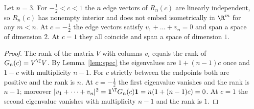 \begin{theorem}\label{thm:main}
Let $n=3$. For $- \frac{1}{2}<c<1$ the $n$ edge vectors of $R_n(c)$ are linearly independent, so $R_n(c)$ has nonempty interior and does not embed isometrically in $\R^m$ for any $m<n$.
At $c=- \frac{1}{2}$ the edge vectors satisfy $v_1+\dots+v_n=0$ and span a space of dimension $2$.
At $c=1$ they all coincide and span a space of dimension $1$.
\end{theorem}
\begin{proof}
The rank of the matrix $V$ with columns $v_i$ equals the rank of $G_n(c)=V^\T V$.
By Lemma~\ref{lem:spec} the eigenvalues are $1+(n-1)c$ once and $1-c$ with multiplicity $n-1$.
For $c$ strictly between the endpoints both are positive and the rank is $n$.
At $c=- \frac{1}{2}$ the first eigenvalue vanishes and the rank is $n-1$; moreover $|v_1+\dots+v_n|^2=\mathbf 1^\T G_n(c)\mathbf 1=n(1+(n-1)c)=0$.
At $c=1$ the second eigenvalue vanishes with multiplicity $n-1$ and the rank is $1$.
\end{proof}
